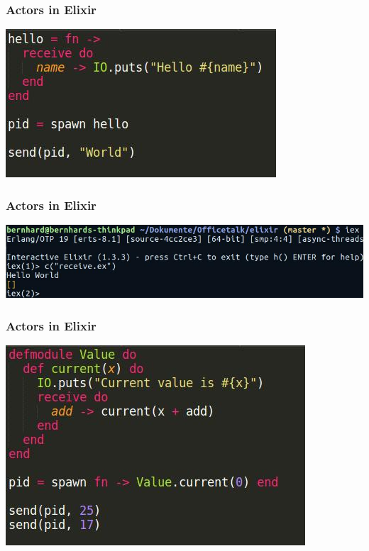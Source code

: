 \documentclass{beamer}
\begin{document}

\begin{frame}
\frametitle{Actors in Elixir}
\includegraphics[width=1\linewidth]{./images/elixir_receive.jpg}
\end{frame}


\begin{frame}
\frametitle{Actors in Elixir}
\includegraphics[width=1\linewidth]{./images/elixir_receive_terminal.jpg}
\end{frame}


\begin{frame}
\frametitle{Actors in Elixir}
\includegraphics[width=0.8\linewidth]{./images/elixir_value.jpg}
\end{frame}
\end{document}
